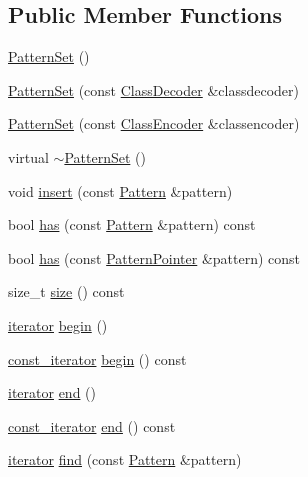 \subsection*{Public Member Functions}
\begin{DoxyCompactItemize}
\item 
\hyperlink{classPatternSet_a8cf2b4c7f096c7a3a7d17342c0153154}{Pattern\+Set} ()
\item 
\hyperlink{classPatternSet_a0174aa499a90c0a191fb3ad9d003c343}{Pattern\+Set} (const \hyperlink{classClassDecoder}{Class\+Decoder} \&classdecoder)
\item 
\hyperlink{classPatternSet_a693cd64ce7f5ab7f0e9c2dc15d8179fe}{Pattern\+Set} (const \hyperlink{classClassEncoder}{Class\+Encoder} \&classencoder)
\item 
virtual \hyperlink{classPatternSet_a4a521fd6ed29c03dad6e665cfe840a01}{$\sim$\+Pattern\+Set} ()
\item 
void \hyperlink{classPatternSet_aee78dae3e67875f22089ba537d50bc29}{insert} (const \hyperlink{classPattern}{Pattern} \&pattern)
\item 
bool \hyperlink{classPatternSet_a25e9ec9ca33750f21dd729cd2462d925}{has} (const \hyperlink{classPattern}{Pattern} \&pattern) const 
\item 
bool \hyperlink{classPatternSet_a28de1eeb8ec5774505173cc28e06320e}{has} (const \hyperlink{classPatternPointer}{Pattern\+Pointer} \&pattern) const 
\item 
size\+\_\+t \hyperlink{classPatternSet_af85860d7135a5154a01a8366131beb39}{size} () const 
\item 
\hyperlink{classPatternSet_a18b78ea966c57db2373741291ba610f3}{iterator} \hyperlink{classPatternSet_ac8c206e63c54d45443a38df762cea863}{begin} ()
\item 
\hyperlink{classPatternSet_a5d419991ea0abb0fbc4a2282574b1b8c}{const\+\_\+iterator} \hyperlink{classPatternSet_af78486457770e3260e73fc233b789a1a}{begin} () const 
\item 
\hyperlink{classPatternSet_a18b78ea966c57db2373741291ba610f3}{iterator} \hyperlink{classPatternSet_a8ef5ec893a3ab9b00cf70cfdf2e623b9}{end} ()
\item 
\hyperlink{classPatternSet_a5d419991ea0abb0fbc4a2282574b1b8c}{const\+\_\+iterator} \hyperlink{classPatternSet_af0b085d67c1aa4c38aa40451868a8500}{end} () const 
\item 
\hyperlink{classPatternSet_a18b78ea966c57db2373741291ba610f3}{iterator} \hyperlink{classPatternSet_a2c56aa5b266f2132f8453bf794bba1f5}{find} (const \hyperlink{classPattern}{Pattern} \&pattern)

\end{DoxyCompactItemize}
